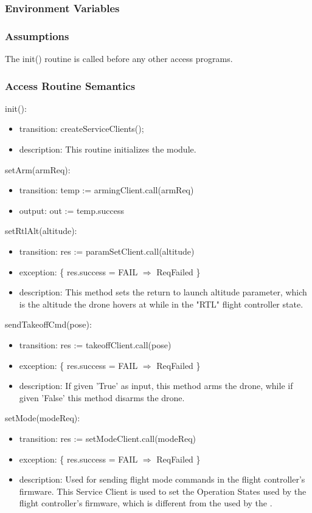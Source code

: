 \documentclass[12pt, titlepage]{article}
\begin{document}
\subsubsection{Environment Variables}
\subsubsection{Assumptions}
The init() routine is called before any other access programs.
\subsubsection{Access Routine Semantics}
\noindent init():
\begin{itemize}
\item transition: createServiceClients();
\item description: This routine initializes the module. 
\end{itemize}
\noindent setArm(armReq):
\begin{itemize}
\item transition: temp := armingClient.call(armReq)
\item output: out := temp.success
\end{itemize}
\noindent setRtlAlt(altitude):
\begin{itemize}
\item transition: res := paramSetClient.call(altitude)
\item exception: \{ res.success = FAIL $\Rightarrow$ ReqFailed \}
\item description: This method sets the return to launch altitude parameter, which is the altitude the drone hovers at while in the "RTL" flight controller state.
\end{itemize}
\noindent sendTakeoffCmd(pose):
\begin{itemize}
\item transition: res := takeoffClient.call(pose)
\item exception: \{ res.success = FAIL $\Rightarrow$ ReqFailed \}
\item description: If given 'True' as input, this method arms the drone, while if given 'False' this method disarms the drone.
\end{itemize}
\noindent setMode(modeReq):
\begin{itemize}
\item transition: res := setModeClient.call(modeReq)
\item exception: \{ res.success = FAIL $\Rightarrow$ ReqFailed \}
\item description: Used for sending flight mode commands in the flight controller's firmware. This Service Client is used to set the Operation States used by the flight controller's firmware, which is different from the  used by the . 
\end{itemize}
\end{document}
